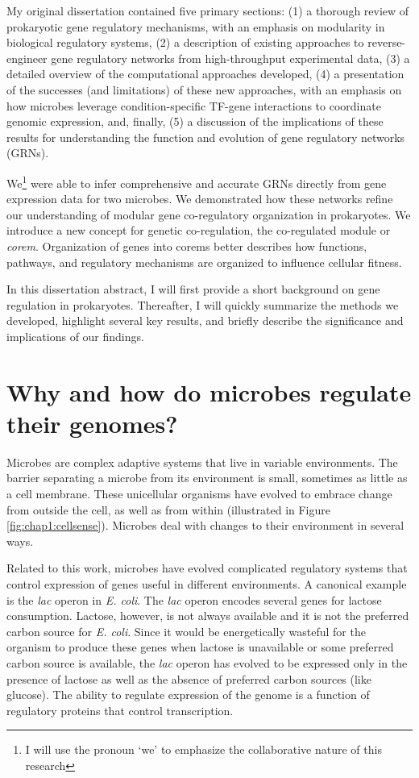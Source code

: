\documentclass{article}
\begin{document}
My original dissertation contained five primary sections: (1) a thorough review of prokaryotic gene regulatory mechanisms, with an emphasis on modularity in biological regulatory systems, (2) a description of existing approaches to reverse-engineer gene regulatory networks from high-throughput experimental data, (3) a detailed overview of the computational approaches developed, (4) a presentation of the successes (and limitations) of these new approaches, with an emphasis on how microbes leverage condition-specific TF-gene interactions to coordinate genomic expression, and, finally, (5) a discussion of the implications of these results for understanding the function and evolution of gene regulatory networks (GRNs).  

We\footnote{I will use the pronoun `we' to emphasize the collaborative nature of this research} were able to infer comprehensive and accurate GRNs directly from gene expression data for two microbes. We demonstrated how these networks refine our understanding of modular gene co-regulatory organization in prokaryotes. We introduce a new concept for genetic co-regulation, the co-regulated module or \textit{corem}. Organization of genes into corems better describes how functions, pathways, and regulatory mechanisms are organized to influence cellular fitness.

In this dissertation abstract, I will first provide a short background on gene regulation in prokaryotes. Thereafter, I will quickly summarize the methods we developed, highlight several key results, and briefly describe the significance and implications of our findings. 

\section{Why and how do microbes regulate their genomes?}

Microbes are complex adaptive systems that live in variable environments. The barrier separating a microbe from its environment is small, sometimes as little as a cell membrane. These unicellular organisms have evolved to embrace change from outside the cell, as well as from within (illustrated in Figure \ref{fig:chap1:cellsense}). Microbes deal with changes to their environment in several ways. 

Related to this work, microbes have evolved complicated regulatory systems that control expression of genes useful in different environments. A canonical example is the \textit{lac} operon in \textit{E. coli}. The \textit{lac} operon encodes several genes for lactose consumption. Lactose, however, is not always available and it is not the preferred carbon source for \textit{E. coli}. Since it would be energetically wasteful for the organism to produce these genes when lactose is unavailable or some preferred carbon source is available, the \textit{lac} operon has evolved to be expressed only in the presence of lactose as well as the absence of preferred carbon sources (like glucose). The ability to regulate expression of the genome is a function of regulatory proteins that control transcription. 
\end{document}
